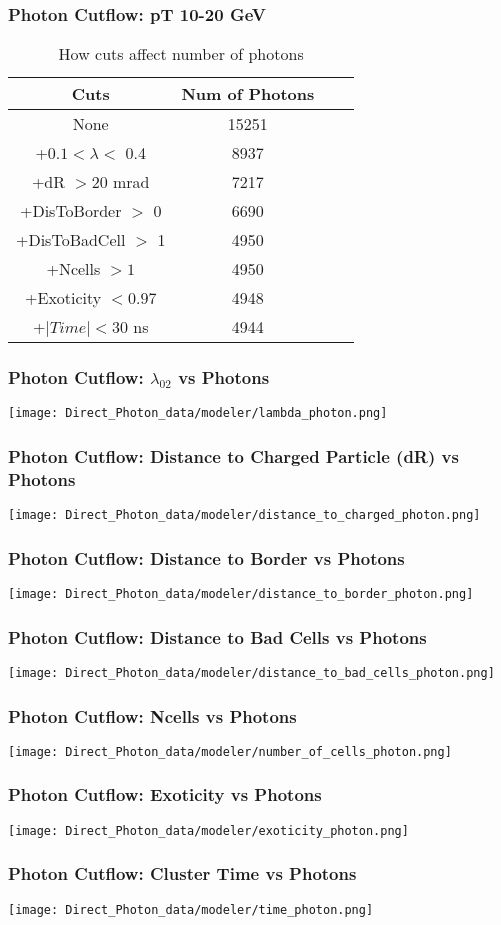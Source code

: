 \documentclass{beamer}
\begin{document}
\frame
{
    \frametitle{Photon Cutflow: pT 10-20 GeV}
     \begin{table} 
     \caption{How cuts affect number of photons} 
     \centering 
     \begin{tabular}{c c c c} 
     \hline\hline 
    Cuts & Num of Photons\\ [0.5ex] 
    \hline
    None & 15251\\
    +$0.1 < \lambda <$ 0.4 & 8937\\
    +dR $> 20$ mrad & 7217\\
    +DisToBorder $>$ 0 & 6690\\
    +DisToBadCell $>$ 1 & 4950\\
    +Ncells $> 1$ & 4950\\
    +Exoticity $< 0.97$ & 4948\\
    +$|Time| < 30$ ns & 4944\\
    [1ex] 
    \hline 
    \end{tabular} 
    \label{table:nonlin} 
    \end{table} 
}

\frame
{
	 \frametitle{Photon Cutflow: $\lambda_{02}$ vs Photons}
	 \texttt{[image: Direct\_Photon\_data/modeler/lambda\_photon.png]}
}

\frame
{
      \frametitle{Photon Cutflow: Distance to Charged Particle (dR) vs Photons}
      \texttt{[image: Direct\_Photon\_data/modeler/distance\_to\_charged\_photon.png]}
}

\frame
{
      \frametitle{Photon Cutflow: Distance to Border vs Photons}
      \texttt{[image: Direct\_Photon\_data/modeler/distance\_to\_border\_photon.png]}
}

\frame
{
      \frametitle{Photon Cutflow: Distance to Bad Cells vs Photons}
      \texttt{[image: Direct\_Photon\_data/modeler/distance\_to\_bad\_cells\_photon.png]}
}

\frame
{
      \frametitle{Photon Cutflow: Ncells vs Photons}
      \texttt{[image: Direct\_Photon\_data/modeler/number\_of\_cells\_photon.png]}
}

\frame
{
      \frametitle{Photon Cutflow: Exoticity vs Photons}
      \texttt{[image: Direct\_Photon\_data/modeler/exoticity\_photon.png]}
}

\frame
{
      \frametitle{Photon Cutflow: Cluster Time vs Photons}
      \texttt{[image: Direct\_Photon\_data/modeler/time\_photon.png]}
}
\end{document}
